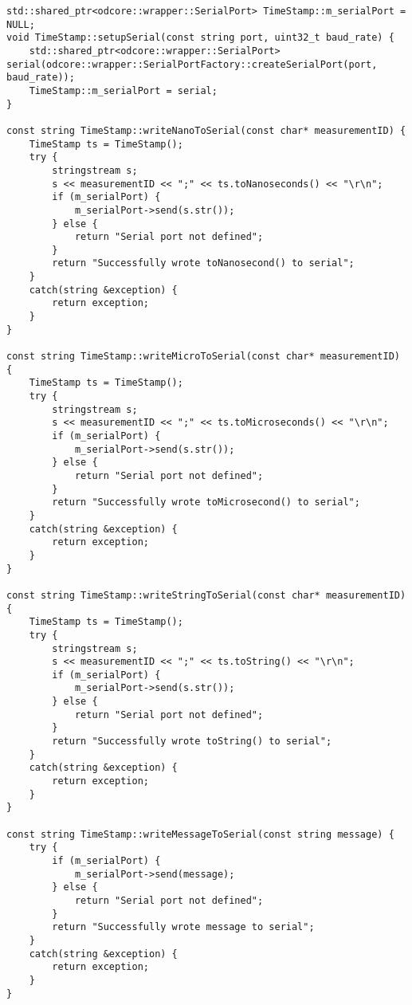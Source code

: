 \begin{lstlisting}[frame=single,label={code:serialtime}]
std::shared_ptr<odcore::wrapper::SerialPort> TimeStamp::m_serialPort = NULL;
void TimeStamp::setupSerial(const string port, uint32_t baud_rate) {
    std::shared_ptr<odcore::wrapper::SerialPort> serial(odcore::wrapper::SerialPortFactory::createSerialPort(port, baud_rate));
    TimeStamp::m_serialPort = serial;
}

const string TimeStamp::writeNanoToSerial(const char* measurementID) {
    TimeStamp ts = TimeStamp();
    try {
        stringstream s;
        s << measurementID << ";" << ts.toNanoseconds() << "\r\n";
        if (m_serialPort) {
            m_serialPort->send(s.str());
        } else {
            return "Serial port not defined";
        }
        return "Successfully wrote toNanosecond() to serial";
    }
    catch(string &exception) {
        return exception;
    }
}

const string TimeStamp::writeMicroToSerial(const char* measurementID) {
    TimeStamp ts = TimeStamp();
    try {
        stringstream s;
        s << measurementID << ";" << ts.toMicroseconds() << "\r\n";
        if (m_serialPort) {
            m_serialPort->send(s.str());
        } else {
            return "Serial port not defined";
        }
        return "Successfully wrote toMicrosecond() to serial";
    }
    catch(string &exception) {
        return exception;
    }
}

const string TimeStamp::writeStringToSerial(const char* measurementID) {
    TimeStamp ts = TimeStamp();
    try {
        stringstream s;
        s << measurementID << ";" << ts.toString() << "\r\n";
        if (m_serialPort) {
            m_serialPort->send(s.str());
        } else {
            return "Serial port not defined";
        }
        return "Successfully wrote toString() to serial";
    }
    catch(string &exception) {
        return exception;
    }
}

const string TimeStamp::writeMessageToSerial(const string message) {
    try {
        if (m_serialPort) {
            m_serialPort->send(message);
        } else {
            return "Serial port not defined";
        }
        return "Successfully wrote message to serial";
    }
    catch(string &exception) {
        return exception;
    }
}
\end{lstlisting}
